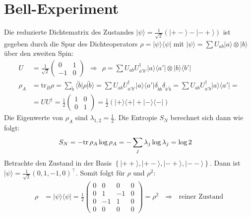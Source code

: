 \documentclass[a4paper,12pt]{article}
\newcommand{\braket}{}
\newcommand{\kla}{}
\newcommand{\klammer}{}
\newcommand{\oper}{}
\newcommand{\tecxt}{}
\newcommand{\Ket}{}
\begin{document}
\section{Bell-Experiment}
Die reduzierte Dichtematrix des Zustandes $\Ket | {\psi} \rangle=\frac{1}{\sqrt{2}}\kla\left( {\Ket | {+-} \rangle-\Ket | {-+} \rangle} \right)$ ist gegeben durch die Spur des Dichteoperators $\rho=\oper | {\psi} \rangle\langle {\psi} |$ mit $\Ket | {\psi} \rangle=\sum U_{ab}\Ket | {a} \rangle\otimes\Ket | {b} \rangle$ über den zweiten Spin:
\begin{align*}
U&=\frac{1}{\sqrt{2}}\begin{pmatrix}
0 & 1 \\ -1 & 0
\end{pmatrix}\ \ \Rightarrow\ \ \rho = \sum U_{ab}U_{a'b'}^\dagger\oper | {a} \rangle\langle {a'} |\otimes\oper | {b} \rangle\langle {b'} | \\
\rho_A&=\tecxt\text{tr}_B\rho=\sum_{\tilde{b}}\braket\langle {\tilde{b}} | {\rho} | {\tilde{b}}\rangle=\sum U_{ab}U_{a'b'}^\dagger \oper | {a} \rangle\langle {a'} |\delta_{\tilde{b}b}\delta_{b'\tilde{b}}=\sum U_{ab}U_{a'b}^\dagger\oper | {a} \rangle\langle {a'} |=\\
&=UU^\dagger=\frac{1}{2}\begin{pmatrix}
1 &0\\ 0&1
\end{pmatrix} =\frac{1}{2}\kla\left( {\oper | {+} \rangle\langle {+} |+\oper | {-} \rangle\langle {-} |} \right)
\end{align*}
Die Eigenwerte von $\rho_A$ sind $\lambda_{1,2}=\frac{1}{2}$. Die Entropie $S_N$ berechnet sich dann wie folgt:
\begin{align*}
S_N&=-\tecxt\text{tr\,}\rho_A\log\rho_A=-\sum_j\lambda_j\log\lambda_j=\log 2
\end{align*}
Betrachte den Zustand in der Basis $\klammer\left\{{\Ket | {++} \rangle,\Ket | {+-} \rangle,\Ket | {-+} \rangle,\Ket | {--} \rangle} \right\}$. Dann ist $\Ket | {\psi} \rangle=\frac{1}{\sqrt{2}}\kla\left( {0,1,-1,0} \right)^\top$. Somit folgt für $\rho$ und $\rho^2$:
\begin{align*}
\rho&=\oper | {\psi} \rangle\langle {\psi} |=\frac{1}{2}\begin{pmatrix}
0&0&0&0\\ 0&1&-1&0 \\ 0&-1&1&0 \\ 0&0&0&0
\end{pmatrix} = \rho^2\ \ \ \Rightarrow\ \ \ \tecxt\text{reiner Zustand}
\end{align*}
\end{document}
